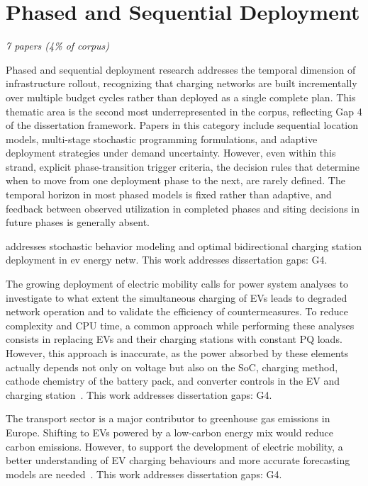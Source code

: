 \documentclass[letterpaper, 12pt, oneside, doublespacing]{Thesis}
\begin{document}
\section{Phased and Sequential Deployment}

\textit{7 papers (4\% of corpus)}

Phased and sequential deployment research addresses the temporal dimension of infrastructure rollout, recognizing that charging networks are built incrementally over multiple budget cycles rather than deployed as a single complete plan. This thematic area is the second most underrepresented in the corpus, reflecting Gap 4 of the dissertation framework. Papers in this category include sequential location models, multi-stage stochastic programming formulations, and adaptive deployment strategies under demand uncertainty. However, even within this strand, explicit phase-transition trigger criteria, the decision rules that determine when to move from one deployment phase to the next, are rarely defined. The temporal horizon in most phased models is fixed rather than adaptive, and feedback between observed utilization in completed phases and siting decisions in future phases is generally absent.


\noindent \cite{stochastic_behavior_2025} addresses stochastic behavior modeling and optimal bidirectional charging station deployment in ev energy netw. This work addresses dissertation gaps: G4.



\noindent The growing deployment of electric mobility calls for power system analyses to investigate to what extent the simultaneous charging of EVs leads to degraded network operation and to validate the efficiency of countermeasures. To reduce complexity and CPU time, a common approach while performing these analyses consists in replacing EVs and their charging stations with constant PQ loads. However, this approach is inaccurate, as the power absorbed by these elements actually depends not only on voltage but also on the SoC, charging method, cathode chemistry of the battery pack, and converter controls in the EV and charging station~\cite{definition_of_2023}. This work addresses dissertation gaps: G4.



\noindent The transport sector is a major contributor to greenhouse gas emissions in Europe. Shifting to EVs powered by a low-carbon energy mix would reduce carbon emissions. However, to support the development of electric mobility, a better understanding of EV charging behaviours and more accurate forecasting models are needed~\cite{forecasting_electric_2023}. This work addresses dissertation gaps: G4.
\end{document}
